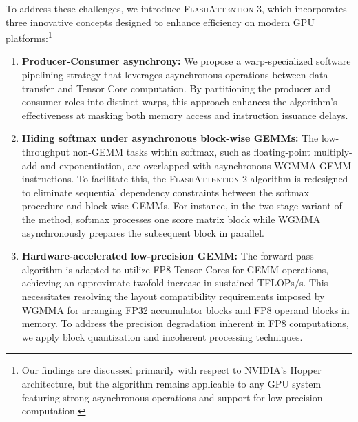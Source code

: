 To address these challenges, we introduce \textsc{FlashAttention-3}, which incorporates three innovative concepts designed to enhance efficiency on modern GPU platforms:\footnote{Our findings are discussed primarily with respect to NVIDIA's Hopper architecture, but the algorithm remains applicable to any GPU system featuring strong asynchronous operations and support for low-precision computation.}

\begin{enumerate}

\item \textbf{Producer-Consumer asynchrony:} We propose a warp-specialized software pipelining strategy that leverages asynchronous operations between data transfer and Tensor Core computation. By partitioning the producer and consumer roles into distinct warps, this approach enhances the algorithm's effectiveness at masking both memory access and instruction issuance delays.

\item \textbf{Hiding softmax under asynchronous block-wise GEMMs:} The low-throughput non-GEMM tasks within softmax, such as floating-point multiply-add and exponentiation, are overlapped with asynchronous WGMMA GEMM instructions. To facilitate this, the \textsc{FlashAttention-2} algorithm is redesigned to eliminate sequential dependency constraints between the softmax procedure and block-wise GEMMs. For instance, in the two-stage variant of the method, softmax processes one score matrix block while WGMMA asynchronously prepares the subsequent block in parallel.

\item \textbf{Hardware-accelerated low-precision GEMM:} The forward pass algorithm is adapted to utilize FP8 Tensor Cores for GEMM operations, achieving an approximate twofold increase in sustained TFLOPs/s. This necessitates resolving the layout compatibility requirements imposed by WGMMA for arranging FP32 accumulator blocks and FP8 operand blocks in memory. To address the precision degradation inherent in FP8 computations, we apply block quantization and incoherent processing techniques.
\end{enumerate}

